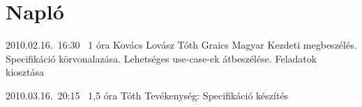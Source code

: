 %
\section{Napló}

\begin{naplo}

\bejegyzes
{2010.02.16.~16:30~} %
{1 óra} %
{Kovács\newline
Lovász\newline
Tóth\newline
Graics\newline
Magyar\newline
} %
{Kezdeti megbeszélés. Specifikáció körvonalazása. Lehetséges use-case-ek átbeszélése. Feladatok kiosztása} %

\bejegyzes
{2010.03.16.~20:15~}
{1,5 óra}
{Tóth}
{Tevékenység: Specifikáció készítés}
\end{naplo}

